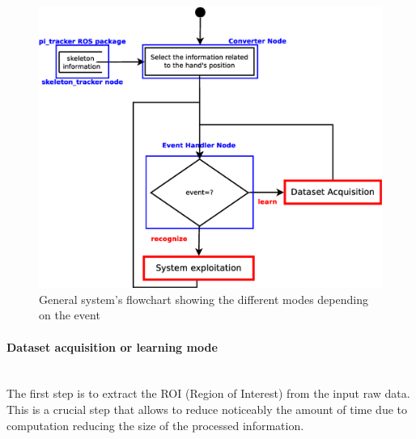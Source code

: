 \begin{figure}[H]
	\begin{center}
\includegraphics[width=0.8\linewidth]{img/diagrams/flowchart1.eps}
	\caption[General system's flowchart]{General system's flowchart showing the different modes depending on the event}
	\label{flowchart1}
	\end{center}
\end{figure}




\paragraph{Dataset acquisition or learning mode}\mbox{}
\\

The first step is to extract the ROI (Region of Interest) from the input raw data. 
This is a crucial step that allows to reduce noticeably the amount of time due to computation reducing the size of the processed information. 

